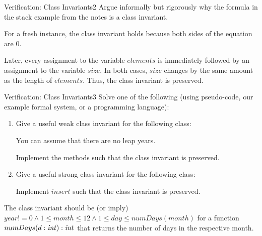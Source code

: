 \documentclass[a4paper]{article}
\begin{document}
\header

\begin{problem}{Verification: Class Invariants}{2}
Argue informally but rigorously why the formula in the stack example from the notes is a class invariant.

\begin{solution}
For a fresh instance, the class invariant holds because both sides of the equation are $0$.

Later, every assignment to the variable $elements$ is immediately followed by an assignment to the variable $size$.
In both cases, $size$ changes by the same amount as the length of $elements$.
Thus, the class invariant is preserved.
\end{solution}
\end{problem}

\begin{problem}{Verification: Class Invariants}{3}
Solve one of the following (using pseudo-code, our example formal system, or a programming language):

\begin{enumerate}
\item Give a useful weak class invariant for the following class:

\begin{acode}
\end{acode}
You can assume that there are no leap years.

Implement the methods such that the class invariant is preserved.

\item Give a useful strong class invariant for the following class:
\begin{acode}
\end{acode}

Implement $insert$ such that the class invariant is preserved.
\end{enumerate}

\begin{solution}
\begin{compactitem}
 \item The class invariant should be (or imply) $year!=0 \wedge 1\leq month\leq 12 \wedge 1\leq day\leq numDays(month)$ for a function $numDays(d:\mathit{int}):\mathit{int}$ that returns the number of days in the respective month.
 

\end{compactitem}
\end{solution}
\end{problem}
\end{document}
